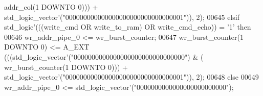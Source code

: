 \begin{DoxyCode}
{      addr_col}\textcolor{vhdlchar}{(}\textcolor{vhdllogic}{}\textcolor{vhdllogic}{1} \textcolor{keywordflow}{DOWNTO} \textcolor{vhdllogic}{}\textcolor{vhdllogic}{0}\textcolor{vhdlchar}{)}\textcolor{vhdlchar}{)}\textcolor{vhdlchar}{)} \textcolor{vhdlchar}{+} \textcolor{comment}{std\_logic\_vector}\textcolor{vhdlchar}{'}\textcolor{vhdlchar}{(}\textcolor{vhdllogic}{"000000000000000000000000000000001"}\textcolor{vhdlchar}{)}\textcolor{vhdlchar}{)}\textcolor{vhdlchar}{,} \textcolor{vhdllogic}{}\textcolor{vhdllogic}{2}\textcolor{vhdlchar}{)};
00645       \textcolor{keywordflow}{elsif} \textcolor{comment}{std\_logic}\textcolor{vhdlchar}{'}\textcolor{vhdlchar}{(}\textcolor{vhdlchar}{(}\textcolor{vhdlchar}{(}\textcolor{vhdlchar}{write_cmd} \textcolor{keywordflow}{OR} \textcolor{vhdlchar}{write_to_ram}\textcolor{vhdlchar}{)} \textcolor{keywordflow}{OR} \textcolor{vhdlchar}{write_cmd_echo}\textcolor{vhdlchar}{)}\textcolor{vhdlchar}{)} \textcolor{vhdlchar}{=} \textcolor{vhdlchar}{'}\textcolor{vhdllogic}{}\textcolor{vhdllogic}{1}\textcolor{vhdlchar}{'} \textcolor{keywordflow}{then} 
00646         \textcolor{vhdlchar}{wr_addr_pipe_0} \textcolor{vhdlchar}{<=} \textcolor{vhdlchar}{wr_burst_counter};
00647         \textcolor{vhdlchar}{wr_burst_counter}\textcolor{vhdlchar}{(}\textcolor{vhdllogic}{}\textcolor{vhdllogic}{1} \textcolor{keywordflow}{DOWNTO} \textcolor{vhdllogic}{}\textcolor{vhdllogic}{0}\textcolor{vhdlchar}{)} \textcolor{vhdlchar}{<=} \textcolor{vhdlchar}{A\_EXT} \textcolor{vhdlchar}{(}\textcolor{vhdlchar}{(}\textcolor{vhdlchar}{(}\textcolor{comment}{std\_logic\_vector}\textcolor{vhdlchar}{'}\textcolor{vhdlchar}{(}\textcolor{vhdllogic}{"0000000000000000000000000000000"}\textcolor{vhdlchar}{)} \textcolor{vhdlchar}{&} \textcolor{vhdlchar}{(}\textcolor{vhdlchar}{
      wr_burst_counter}\textcolor{vhdlchar}{(}\textcolor{vhdllogic}{}\textcolor{vhdllogic}{1} \textcolor{keywordflow}{DOWNTO} \textcolor{vhdllogic}{}\textcolor{vhdllogic}{0}\textcolor{vhdlchar}{)}\textcolor{vhdlchar}{)}\textcolor{vhdlchar}{)} \textcolor{vhdlchar}{+} \textcolor{comment}{std\_logic\_vector}\textcolor{vhdlchar}{'}\textcolor{vhdlchar}{(}\textcolor{vhdllogic}{"000000000000000000000000000000001"}\textcolor{vhdlchar}{)}\textcolor{vhdlchar}{)}\textcolor{vhdlchar}{,} \textcolor{vhdllogic}{}\textcolor{vhdllogic}{2}\textcolor{vhdlchar}{)};
00648       \textcolor{keywordflow}{else}
00649         \textcolor{vhdlchar}{wr_addr_pipe_0} \textcolor{vhdlchar}{<=} \textcolor{comment}{std\_logic\_vector}\textcolor{vhdlchar}{'}\textcolor{vhdlchar}{(}\textcolor{vhdllogic}{"0000000000000000000000000"}\textcolor{vhdlchar}{)};

\end{DoxyCode}
